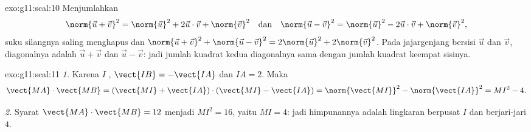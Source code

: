 \begin{solution}{exo:g11:scal:10}
Menjumlahkan
\[
\norm{\vec u + \vec v}^2 = \norm{\vec u}^2 + 2\vec u\cdot\vec v +
\norm{\vec v}^2
\quad\text{dan}\quad
\norm{\vec u - \vec v}^2 = \norm{\vec u}^2 - 2\vec u\cdot\vec v +
\norm{\vec v}^2,
\]
suku silangnya saling menghapus dan
$\norm{\vec u + \vec v}^2 + \norm{\vec u - \vec v}^2 = 2\norm{\vec u}^2 +
2\norm{\vec v}^2$. Pada jajargenjang bersisi $\vec u$ dan $\vec v$,
diagonalnya adalah $\vec u + \vec v$ dan $\vec u - \vec v$: jadi jumlah
kuadrat kedua diagonalnya sama dengan jumlah kuadrat keempat
sisinya.
\end{solution}

\begin{solution}{exo:g11:scal:11}
\emph{1.} Karena $I$ , $\vect{IB} = -\vect{IA}$ dan
$IA = 2$. Maka
\[
\vect{MA}\cdot\vect{MB}
= (\vect{MI} + \vect{IA})\cdot(\vect{MI} - \vect{IA})
= \norm{\vect{MI}}^2 - \norm{\vect{IA}}^2
= MI^2 - 4 .
\]

\emph{2.} Syarat $\vect{MA}\cdot\vect{MB} = 12$ menjadi
$MI^2 = 16$, yaitu $MI = 4$: jadi himpunannya adalah lingkaran berpusat $I$
dan berjari-jari $4$.
\end{solution}

